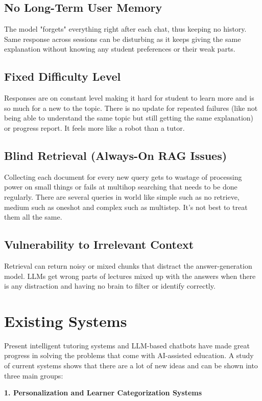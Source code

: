 \documentclass[11pt, a4paper, oneside]{report}
\begin{document}
\subsection{No Long-Term User Memory}
The model "forgets" everything right after each chat, thus keeping no history. Same response across sessions can be disturbing as it keeps giving the same explanation without knowing any student preferences or their weak parts.

\subsection{Fixed Difficulty Level}
Responses are on constant level making it hard for student to learn more and is so much for a new to the topic. There is no update for repeated failures (like not being able to understand the same topic but still getting the same explanation) or progress report. It feels more like a robot than a tutor.

\subsection{Blind Retrieval (Always-On RAG Issues)}
Collecting each document for every new query gets to wastage of processing power on small things or fails at multihop searching that needs to be done regularly. There are several queries in world like simple such as no retrieve, medium such as oneshot and complex such as multistep. It's not best to treat them all the same.

\subsection{Vulnerability to Irrelevant Context}
Retrieval can return noisy or mixed chunks that distract the answer-generation model. LLMs get wrong parts of lectures mixed up with the answers
when there is any distraction and having no brain to filter or identify correctly.

\section{Existing Systems}

Present intelligent tutoring systems and LLM-based chatbots have made great progress in solving the problems that come with AI-assisted education. A study of current systems shows that there are a lot of new ideas and can be shown into three main groups:

\vspace{0.3cm}
\noindent\textbf{1. Personalization and Learner Categorization Systems}
\end{document}
